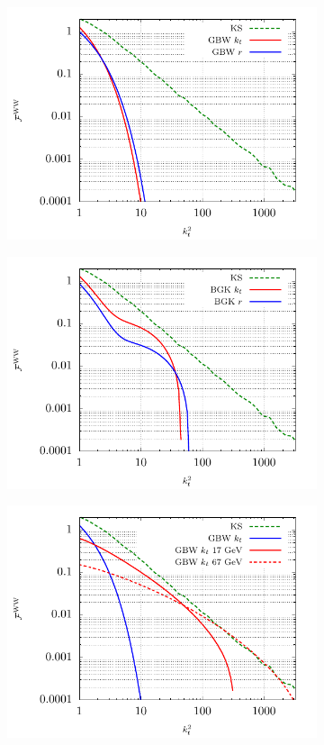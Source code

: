 \documentclass[a4,12pt]{article}
\begin{document}
	\begin{figure}[t]
		\begin{subfigure}{0.5\textwidth}
			\includegraphics[width=\textwidth]{gnuplot/GBWWW1} 
		\end{subfigure}
		\begin{subfigure}{0.5\textwidth}
			\includegraphics[width=\textwidth]{gnuplot/BGKWW1} 
		\end{subfigure}
		\begin{subfigure}{0.5\textwidth}
			\includegraphics[width=\textwidth]{gnuplot/GBWWW2} 

\end{subfigure}
\end{figure}
\end{document}
